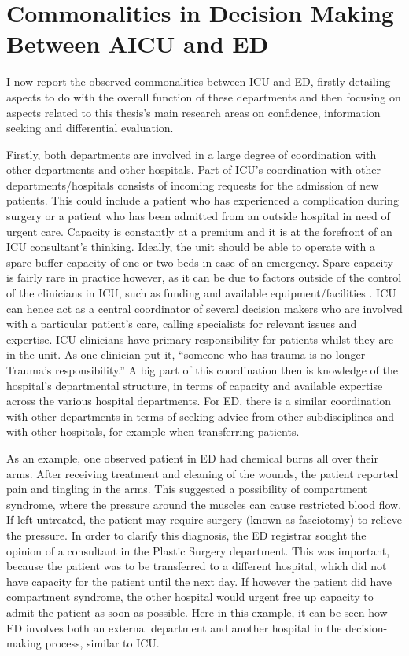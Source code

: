 \documentclass[a4paper, nobind]{templates/ociamthesis}
\begin{document}
\section{Commonalities in Decision Making Between AICU and ED}\label{commonalities-in-decision-making-between-aicu-and-ed}

I now report the observed commonalities between ICU and ED, firstly detailing aspects to do with the overall function of these departments and then focusing on aspects related to this thesis's main research areas on confidence, information seeking and differential evaluation.

\hfill\break
Firstly, both departments are involved in a large degree of coordination with other departments and other hospitals. Part of ICU's coordination with other departments/hospitals consists of incoming requests for the admission of new patients. This could include a patient who has experienced a complication during surgery or a patient who has been admitted from an outside hospital in need of urgent care. Capacity is constantly at a premium and it is at the forefront of an ICU consultant's thinking. Ideally, the unit should be able to operate with a spare buffer capacity of one or two beds in case of an emergency. Spare capacity is fairly rare in practice however, as it can be due to factors outside of the control of the clinicians in ICU, such as funding and available equipment/facilities \autocite{gooch_icu_2014,murthy_intensive_2015}. ICU can hence act as a central coordinator of several decision makers who are involved with a particular patient's care, calling specialists for relevant issues and expertise. ICU clinicians have primary responsibility for patients whilst they are in the unit. As one clinician put it, ``someone who has trauma is no longer Trauma's responsibility.'' A big part of this coordination then is knowledge of the hospital's departmental structure, in terms of capacity and available expertise across the various hospital departments. For ED, there is a similar coordination with other departments in terms of seeking advice from other subdisciplines and with other hospitals, for example when transferring patients.

\hfill\break
As an example, one observed patient in ED had chemical burns all over their arms. After receiving treatment and cleaning of the wounds, the patient reported pain and tingling in the arms. This suggested a possibility of compartment syndrome, where the pressure around the muscles can cause restricted blood flow. If left untreated, the patient may require surgery (known as fasciotomy) to relieve the pressure. In order to clarify this diagnosis, the ED registrar sought the opinion of a consultant in the Plastic Surgery department. This was important, because the patient was to be transferred to a different hospital, which did not have capacity for the patient until the next day. If however the patient did have compartment syndrome, the other hospital would urgent free up capacity to admit the patient as soon as possible. Here in this example, it can be seen how ED involves both an external department and another hospital in the decision-making process, similar to ICU.
\end{document}
